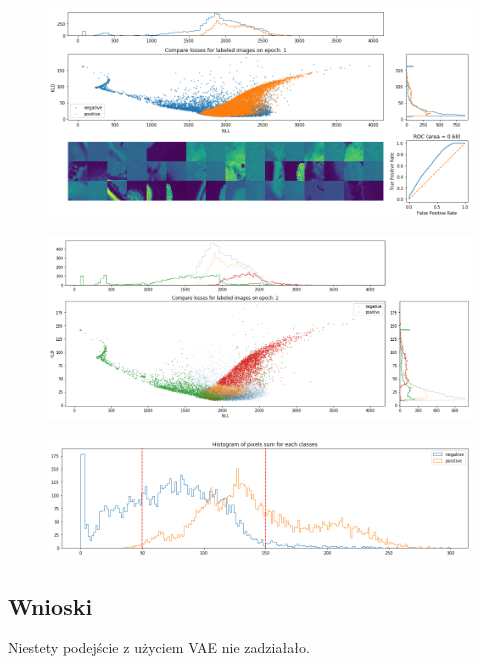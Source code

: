 \begin{figure}[h!]
    \centering
    \includegraphics[width=1.0\textwidth]{images/soft_vae}
    \caption{}
    \label{fig:soft_vae}
\end{figure}

\begin{figure}[h!]
    \centering
    \includegraphics[width=1.0\textwidth]{images/soft_vae_th}
    \caption{}
    \label{fig:soft_vae_th}
\end{figure}

\begin{figure}[h!]
    \centering
    \includegraphics[width=1.0\textwidth]{images/pixels_hist}
    \caption{}
    \label{fig:pixels_hist}
\end{figure}

\subsection{Wnioski}

Niestety podejście z użyciem VAE nie zadziałało.




